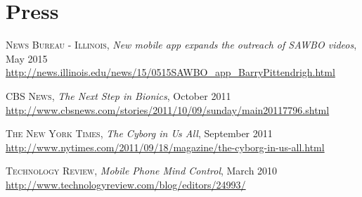 \section{\sc Press}
\textsc{News Bureau - Illinois}, \emph{New mobile app expands the outreach of SAWBO videos}, May 2015\\
\url{http://news.illinois.edu/news/15/0515SAWBO_app_BarryPittendrigh.html}
\vspace*{-2.5mm}

\textsc{CBS News}, \emph{The Next Step in Bionics}, October 2011\\
\url{http://www.cbsnews.com/stories/2011/10/09/sunday/main20117796.shtml}
\vspace*{-2.5mm}

\textsc{The New York Times}, \emph{The Cyborg in Us All}, September 2011\\
\url{http://www.nytimes.com/2011/09/18/magazine/the-cyborg-in-us-all.html}
\vspace*{-2.5mm}

\textsc{Technology Review}, \emph{Mobile Phone Mind Control}, March 2010\\
\url{http://www.technologyreview.com/blog/editors/24993/}
\vspace*{-2.5mm}
